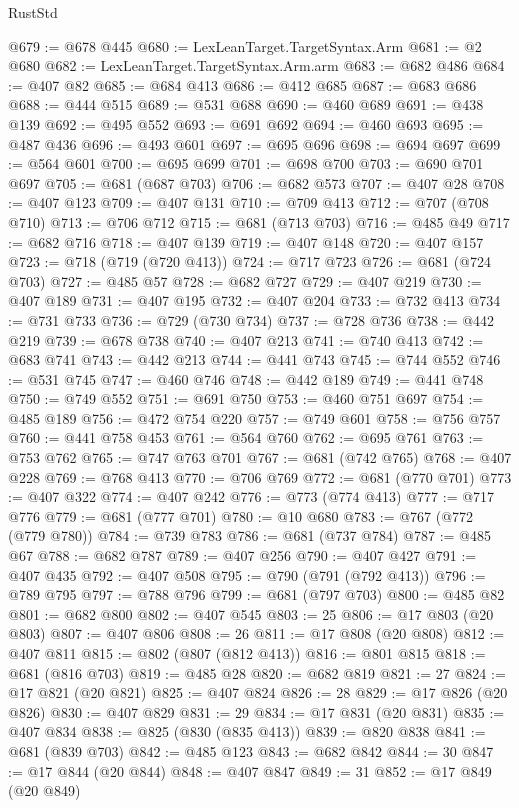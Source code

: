 \begin{lexlean}{RustStd}
\begin{coremodule}
{\begin{coremodule}
{{{{{{{{{{{{{{{{{{{{{{{{{@679 := @678 @445
@680 := LexLeanTarget.TargetSyntax.Arm
@681 := @2 @680
@682 := LexLeanTarget.TargetSyntax.Arm.arm
@683 := @682 @486
@684 := @407 @82
@685 := @684 @413
@686 := @412 @685
@687 := @683 @686
@688 := @444 @515
@689 := @531 @688
@690 := @460 @689
@691 := @438 @139
@692 := @495 @552
@693 := @691 @692
@694 := @460 @693
@695 := @487 @436
@696 := @493 @601
@697 := @695 @696
@698 := @694 @697
@699 := @564 @601
@700 := @695 @699
@701 := @698 @700
@703 := @690 @701 @697
@705 := @681 (@687 @703)
@706 := @682 @573
@707 := @407 @28
@708 := @407 @123
@709 := @407 @131
@710 := @709 @413
@712 := @707 (@708 @710)
@713 := @706 @712
@715 := @681 (@713 @703)
@716 := @485 @49
@717 := @682 @716
@718 := @407 @139
@719 := @407 @148
@720 := @407 @157
@723 := @718 (@719 (@720 @413))
@724 := @717 @723
@726 := @681 (@724 @703)
@727 := @485 @57
@728 := @682 @727
@729 := @407 @219
@730 := @407 @189
@731 := @407 @195
@732 := @407 @204
@733 := @732 @413
@734 := @731 @733
@736 := @729 (@730 @734)
@737 := @728 @736
@738 := @442 @219
@739 := @678 @738
@740 := @407 @213
@741 := @740 @413
@742 := @683 @741
@743 := @442 @213
@744 := @441 @743
@745 := @744 @552
@746 := @531 @745
@747 := @460 @746
@748 := @442 @189
@749 := @441 @748
@750 := @749 @552
@751 := @691 @750
@753 := @460 @751 @697
@754 := @485 @189
@756 := @472 @754 @220
@757 := @749 @601
@758 := @756 @757
@760 := @441 @758 @453
@761 := @564 @760
@762 := @695 @761
@763 := @753 @762
@765 := @747 @763 @701
@767 := @681 (@742 @765)
@768 := @407 @228
@769 := @768 @413
@770 := @706 @769
@772 := @681 (@770 @701)
@773 := @407 @322
@774 := @407 @242
@776 := @773 (@774 @413)
@777 := @717 @776
@779 := @681 (@777 @701)
@780 := @10 @680
@783 := @767 (@772 (@779 @780))
@784 := @739 @783
@786 := @681 (@737 @784)
@787 := @485 @67
@788 := @682 @787
@789 := @407 @256
@790 := @407 @427
@791 := @407 @435
@792 := @407 @508
@795 := @790 (@791 (@792 @413))
@796 := @789 @795
@797 := @788 @796
@799 := @681 (@797 @703)
@800 := @485 @82
@801 := @682 @800
@802 := @407 @545
@803 := 25
@806 := @17 @803 (@20 @803)
@807 := @407 @806
@808 := 26
@811 := @17 @808 (@20 @808)
@812 := @407 @811
@815 := @802 (@807 (@812 @413))
@816 := @801 @815
@818 := @681 (@816 @703)
@819 := @485 @28
@820 := @682 @819
@821 := 27
@824 := @17 @821 (@20 @821)
@825 := @407 @824
@826 := 28
@829 := @17 @826 (@20 @826)
@830 := @407 @829
@831 := 29
@834 := @17 @831 (@20 @831)
@835 := @407 @834
@838 := @825 (@830 (@835 @413))
@839 := @820 @838
@841 := @681 (@839 @703)
@842 := @485 @123
@843 := @682 @842
@844 := 30
@847 := @17 @844 (@20 @844)
@848 := @407 @847
@849 := 31
@852 := @17 @849 (@20 @849)
}}}}}}}}}}}}}}}}}}}}}}}}}
\end{coremodule}}
\end{coremodule}
\end{lexlean}
